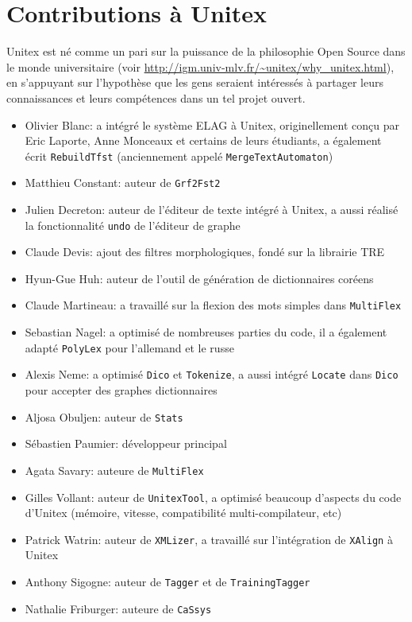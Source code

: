\clearpage

\section*{Contributions à Unitex}
Unitex est né comme un pari sur la puissance de la philosophie Open Source dans le monde
universitaire (voir \url{http://igm.univ-mlv.fr/~unitex/why_unitex.html}), en s'appuyant sur l'hypothèse que les gens seraient intéressés à partager leurs connaissances et leurs compétences dans un tel projet ouvert.

\begin{itemize}                   
    \item Olivier Blanc: a intégré le système ELAG à Unitex, originellement conçu par Eric Laporte,
    Anne Monceaux et certains de leurs étudiants, a également écrit \verb+RebuildTfst+ (anciennement
     appelé \verb+MergeTextAutomaton+)
    \item Matthieu Constant: auteur de \verb+Grf2Fst2+
    \item Julien Decreton: auteur de l'éditeur de texte intégré à Unitex,
    	    a aussi réalisé la fonctionnalité \verb+undo+ de l'éditeur de graphe
    \item Claude Devis: ajout des filtres morphologiques, fondé sur la librairie TRE
    \item Hyun-Gue Huh: auteur de l'outil de génération de dictionnaires coréens
    \item Claude Martineau: a travaillé sur la flexion des mots simples dans \verb+MultiFlex+
    \item Sebastian Nagel: a optimisé de nombreuses parties du code, il a également adapté
    	    \verb+PolyLex+ pour l'allemand et le russe
    \item Alexis Neme: a optimisé \verb+Dico+ et \verb+Tokenize+, a aussi intégré \verb+Locate+ dans \verb+Dico+ pour accepter des graphes dictionnaires
     \item Aljosa Obuljen: auteur de \verb+Stats+
     \item Sébastien Paumier: développeur principal
     \item Agata Savary: auteure de \verb+MultiFlex+
    \item Gilles Vollant: auteur de \verb+UnitexTool+, a optimisé beaucoup
    	    d'aspects du code d'Unitex (mémoire, vitesse, compatibilité multi-compilateur, etc)
    \item Patrick Watrin: auteur de \verb+XMLizer+, a travaillé sur l'intégration de \verb+XAlign+ à Unitex
    \item Anthony Sigogne: auteur de \verb+Tagger+ et de \verb+TrainingTagger+
    \item Nathalie Friburger: auteure de \verb+CaSsys+
\end{itemize}

